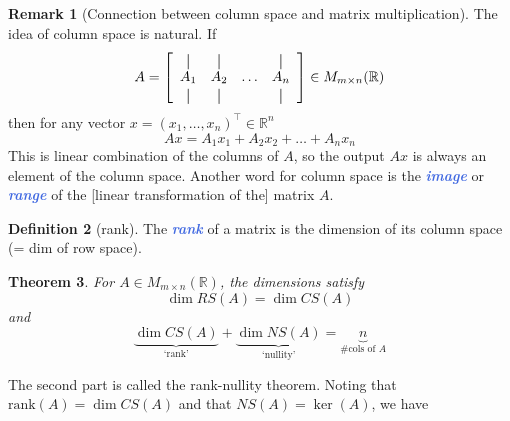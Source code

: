 \documentclass[10pt]{article}
\newcommand{\demph}[1]{\textcolor{RoyalBlue}{\textbf{\slshape #1}}} %
\newtheorem{theorem}{Theorem}
\theoremstyle{definition}
\newtheorem{definition}[theorem]{Definition}
\newtheorem{remark}[theorem]{Remark}
\newcommand{\R}{\mathbb{R}}           %
\begin{document}
\begin{remark}[Connection between column space and matrix multiplication]
  The idea of column space is natural. If
  \newcommand*{\vertbar}{\rule[-1ex]{0.5pt}{2.5ex}}
  \newcommand*{\horzbar}{\,\rule[.5ex]{2.5ex}{0.5pt}\,}
  \begin{equation*}
    A = 
    \left[
      \begin{array}{cccc}
        \vertbar & \vertbar &        & \vertbar \\
        A_{1}    & A_{2}    & \ldots & A_{n}    \\
        \vertbar & \vertbar &        & \vertbar 
      \end{array}
    \right]\in M_{m\times n}(\R)
  \end{equation*}
  then for any vector $x= (x_{1},\ldots,x_{n})^{\top} \in \R^{n}$
  \begin{equation*}
    Ax = A_{1}x_{1}+A_{2}x_{2}+\ldots+A_{n}x_{n}
  \end{equation*}
  This is linear combination of the columns of $A$, so the output $Ax$ is
  always an element of the column space. Another word for column space is the
  \demph{image} or \demph{range} of the [linear transformation of the] matrix $A$.
\end{remark}


\begin{definition}[rank]
  The \demph{rank} of a matrix is the dimension of its column space (= dim of
  row space).
\end{definition}


\begin{theorem}
  For $A\in M_{m\times n}(\R)$, the dimensions satisfy
  \begin{equation*}
    \dim RS(A) = \dim CS(A)
  \end{equation*}
  and
  \begin{equation*}
    \underbrace{\dim CS(A)}_{\text{`rank'}} + \underbrace{\dim
      NS(A)}_{\text{`nullity'}} = \underbrace{n}_{\text{\# cols of }A}
  \end{equation*}
\end{theorem}
The second part is called the rank-nullity theorem. Noting that
$\mathrm{rank}(A)=\dim CS(A)$ and that $NS(A) = \ker(A)$, we have
\end{document}
